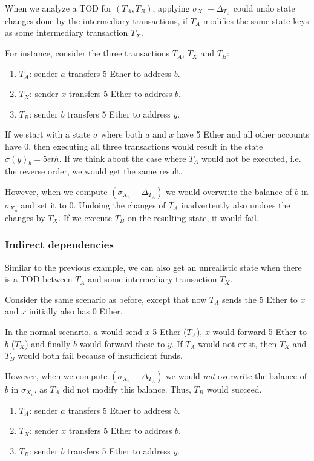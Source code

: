 \documentclass[draft,final]{vutinfth} %
\begin{document}
When we analyze a TOD for $(T_A, T_B)$, applying $\sigma_{X_n} - \Delta_{T_A}$ could undo state changes done by the intermediary transactions, if $T_A$ modifies the same state keys as some intermediary transaction $T_X$.

For instance, consider the three transactions $T_A$, $T_X$ and $T_B$:

\begin{enumerate}
    \item $T_A$: sender $a$ transfers 5 Ether to address $b$.
    \item $T_X$: sender $x$ transfers 5 Ether to address $b$.
    \item $T_B$: sender $b$ transfers 5 Ether to address $y$.
\end{enumerate}

If we start with a state $\sigma$ where both $a$ and $x$ have 5 Ether and all other accounts have 0, then executing all three transactions would result in the state $\sigma(y)_b = 5 eth$. If we think about the case where $T_A$ would not be executed, i.e. the reverse order, we would get the same result.

However, when we compute $(\sigma_{X_n} - \Delta_{T_A})$ we would overwrite the balance of $b$ in $\sigma_{X_n}$ and set it to 0. Undoing the changes of $T_A$ inadvertently also undoes the changes by $T_X$. If we execute $T_B$ on the resulting state, it would fail.

\subsubsection{Indirect dependencies}

Similar to the previous example, we can also get an unrealistic state when there is a TOD between $T_A$ and some intermediary transaction $T_X$.

Consider the same scenario as before, except that now $T_A$ sends the 5 Ether to $x$ and $x$ initially also has 0 Ether.

In the normal scenario, $a$ would send $x$ 5 Ether ($T_A$), $x$ would forward 5 Ether to $b$ ($T_X$) and finally $b$ would forward these to $y$. If $T_A$ would not exist, then $T_X$ and $T_B$ would both fail because of insufficient funds.

However, when we compute $(\sigma_{X_n} - \Delta_{T_A})$ we would \emph{not} overwrite the balance of $b$ in $\sigma_{X_n}$, as $T_A$ did not modify this balance. Thus, $T_B$ would succeed.

\begin{enumerate}
    \item $T_A$: sender $a$ transfers 5 Ether to address $b$.
    \item $T_X$: sender $x$ transfers 5 Ether to address $b$.
    \item $T_B$: sender $b$ transfers 5 Ether to address $y$.
\end{enumerate}
\end{document}
